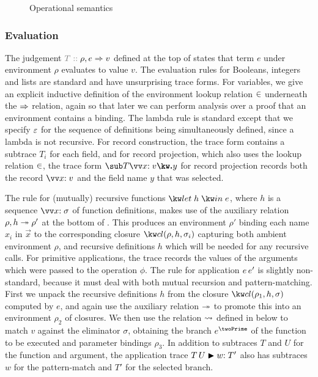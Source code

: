 \begin{figure}
   \vspace{1mm}
   
   
   \caption{Operational semantics}
   \label{fig:core-language:semantics}
\end{figure}



\subsubsection{Evaluation}
\label{sec:core-language:eval}

The judgement $\explVal{T}{\rho, e \evalR v}$ defined at the top of  states that term $e$ under environment $\rho$ evaluates to value $v$. The evaluation rules for Booleans, integers and lists are standard and have unsurprising trace forms. For variables, we give an explicit inductive definition of the environment lookup relation $\in$ underneath the $\Rightarrow$ relation, again so that later we can perform analysis over a proof that an environment contains a binding. The lambda rule is standard except that we specify $\varepsilon$ for the sequence of definitions being simultaneously defined, since a lambda is not recursive. For record construction, the trace form contains a subtrace $T_i$ for each field, and for record projection, which also uses the lookup relation $\in$, the trace form $\trRecProj{T}{\vec{\bind{x}{v}}}{y}$ for record projection records both the record $\vec{\bind{x}{v}}$ and the field name $y$ that was selected.

The rule for (mutually) recursive functions $\exLetRecMutual{h}{e}$, where $h$ is a sequence $\vec{\bind{x}{\sigma}}$ of function definitions, makes use of the auxiliary relation $\rho, h \twoheadrightarrow \rho'$ at the bottom of . This produces an environment $\rho'$ binding each name $x_i$ in $\vec{x}$ to the corresponding closure $\exClosure{\rho}{h}{\sigma_i}$ capturing both ambient environment $\rho$, and recursive definitions $h$ which will be needed for any recursive calls. For primitive applications, the trace records the values of the arguments which were passed to the operation $\phi$. The rule for application ${e}\,{e'}$ is slightly non-standard, because it must deal with both mutual recursion and pattern-matching. First we unpack the recursive definitions $h$ from the closure $\exClosure{\rho_1}{h}{\sigma}$ computed by $e$, and again use the auxiliary relation $\twoheadrightarrow$ to promote this into an environment $\rho_2$ of closures. We then use the relation $\rightsquigarrow$ defined in  below to match $v$ against the eliminator $\sigma$, obtaining the branch $e^\twoPrime$ of the function to be executed and parameter bindings $\rho_3$. In addition to subtraces $T$ and $U$ for the function and argument, the application trace ${T}\,{U} \mathrel{\blacktriangleright} {w{:}\;T'}$ also has subtraces $w$ for the pattern-match and $T'$ for the selected branch.

